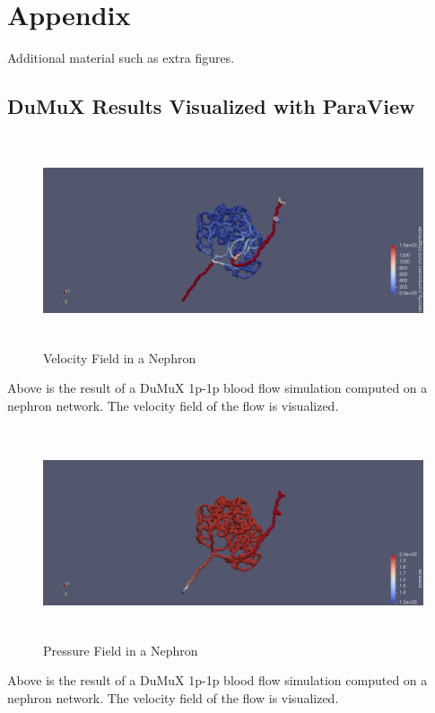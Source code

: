 
\section{Appendix}
\label{s:Appendix}

Additional material such as extra figures.
\subsection{DuMuX Results Visualized with ParaView}
\begin{figure}[h]
\centering
\includegraphics[height=62mm]{nephron_velocity}
\caption{Velocity Field in a Nephron}
\label{fig:nephron_velocity}
\end{figure}
Above is the result of a DuMuX 1p-1p blood flow simulation computed on a nephron network. The velocity field of the flow is visualized.\\

\begin{figure}[h]
\centering
\includegraphics[height=62mm]{nephron_pressure}
\caption{Pressure Field in a Nephron}
\label{fig:nephron_pressure}
\end{figure}
Above is the result of a DuMuX 1p-1p blood flow simulation computed on a nephron network. The velocity field of the flow is visualized.\\

